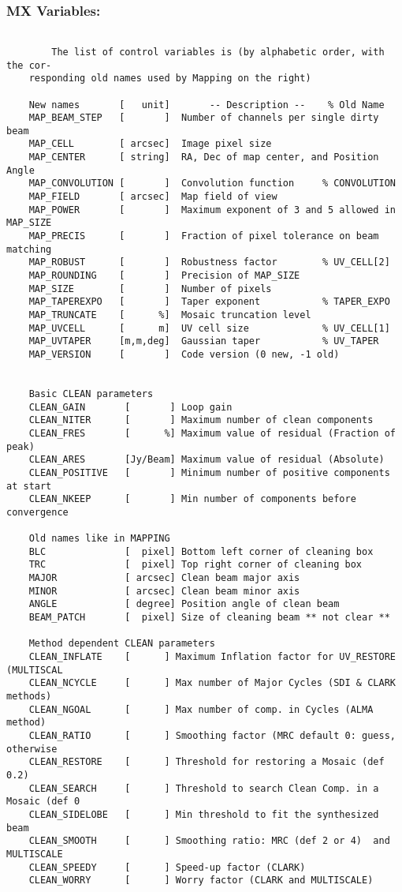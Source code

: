 \subsubsection{MX Variables:}
\begin{verbatim}

        The list of control variables is (by alphabetic order, with the cor-
    responding old names used by Mapping on the right)

    New names       [   unit]       -- Description --    % Old Name
    MAP_BEAM_STEP   [       ]  Number of channels per single dirty beam
    MAP_CELL        [ arcsec]  Image pixel size
    MAP_CENTER      [ string]  RA, Dec of map center, and Position Angle
    MAP_CONVOLUTION [       ]  Convolution function     % CONVOLUTION
    MAP_FIELD       [ arcsec]  Map field of view
    MAP_POWER       [       ]  Maximum exponent of 3 and 5 allowed in MAP_SIZE
    MAP_PRECIS      [       ]  Fraction of pixel tolerance on beam matching
    MAP_ROBUST      [       ]  Robustness factor        % UV_CELL[2]
    MAP_ROUNDING    [       ]  Precision of MAP_SIZE
    MAP_SIZE        [       ]  Number of pixels
    MAP_TAPEREXPO   [       ]  Taper exponent           % TAPER_EXPO
    MAP_TRUNCATE    [      %]  Mosaic truncation level
    MAP_UVCELL      [      m]  UV cell size             % UV_CELL[1]
    MAP_UVTAPER     [m,m,deg]  Gaussian taper           % UV_TAPER
    MAP_VERSION     [       ]  Code version (0 new, -1 old)


    Basic CLEAN parameters
    CLEAN_GAIN       [       ] Loop gain
    CLEAN_NITER      [       ] Maximum number of clean components
    CLEAN_FRES       [      %] Maximum value of residual (Fraction of peak)
    CLEAN_ARES       [Jy/Beam] Maximum value of residual (Absolute)
    CLEAN_POSITIVE   [       ] Minimum number of positive components at start
    CLEAN_NKEEP      [       ] Min number of components before convergence

    Old names like in MAPPING
    BLC              [  pixel] Bottom left corner of cleaning box
    TRC              [  pixel] Top right corner of cleaning box
    MAJOR            [ arcsec] Clean beam major axis
    MINOR            [ arcsec] Clean beam minor axis
    ANGLE            [ degree] Position angle of clean beam
    BEAM_PATCH       [  pixel] Size of cleaning beam ** not clear **

    Method dependent CLEAN parameters
    CLEAN_INFLATE    [      ] Maximum Inflation factor for UV_RESTORE (MULTISCAL
    CLEAN_NCYCLE     [      ] Max number of Major Cycles (SDI & CLARK methods)
    CLEAN_NGOAL      [      ] Max number of comp. in Cycles (ALMA method)
    CLEAN_RATIO      [      ] Smoothing factor (MRC default 0: guess, otherwise
    CLEAN_RESTORE    [      ] Threshold for restoring a Mosaic (def 0.2)
    CLEAN_SEARCH     [      ] Threshold to search Clean Comp. in a Mosaic (def 0
    CLEAN_SIDELOBE   [      ] Min threshold to fit the synthesized beam
    CLEAN_SMOOTH     [      ] Smoothing ratio: MRC (def 2 or 4)  and MULTISCALE
    CLEAN_SPEEDY     [      ] Speed-up factor (CLARK)
    CLEAN_WORRY      [      ] Worry factor (CLARK and MULTISCALE)

\end{verbatim}
